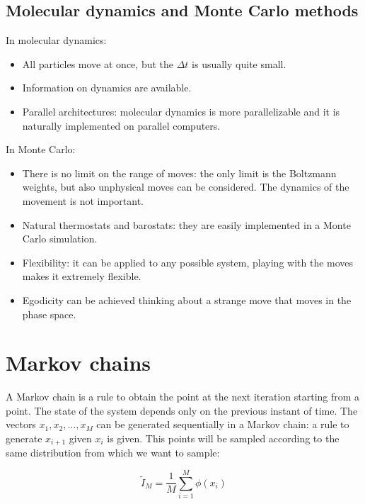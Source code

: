 	\subsection{Molecular dynamics and Monte Carlo methods}
	In molecular dynamics:

	\begin{multicols}{2}
		\begin{itemize}
			\item All particles move at once, but the $\Delta t$ is usually quite small.
			\item Information on dynamics are available.
			\item Parallel architectures: molecular dynamics is more parallelizable and it is naturally implemented on parallel computers.
		\end{itemize}
	\end{multicols}

	In Monte Carlo:

	\begin{multicols}{2}
		\begin{itemize}
			\item There is no limit on the range of moves: the only limit is the Boltzmann weights, but also unphysical moves can be considered.
				The dynamics of the movement is not important.
			\item Natural thermostats and barostats: they are easily implemented in a Monte Carlo simulation.
			\item Flexibility: it can be applied to any possible system, playing with the moves makes it extremely flexible.
			\item Egodicity can be achieved thinking about a strange move that moves in the phase space.
		\end{itemize}
	\end{multicols}

\section{Markov chains}
A Markov chain is a rule to obtain the point at the next iteration starting from a point.
The state of the system depends only on the previous instant of time.
The vectors $x_1, x_2, \dots, x_M$ can be generated sequentially in a Markov chain: a rule to generate $x_{i+1}$ given $x_i$ is given.
This points will be sampled according to the same distribution from which we want to sample:

$$\tilde{I}_M = \frac{1}{M}\sum\limits_{i=1}^M\phi(x_i)$$

